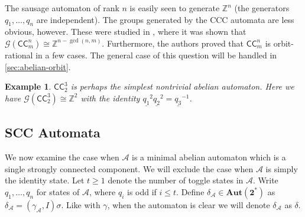 \documentclass[12pt, letterpaper]{article}
\newcommand{\Z}{\mathbb Z}
\newcommand{\bin}{\mathbf 2}
\newcommand{\A}{\mathcal A}
\newcommand{\CC}{\mathsf{CC}}
\newcommand{\Aut}{\mathbf{Aut}}
\newcommand{\gp}{\mathcal G}
\newtheorem{example}[thm]{Example}
\begin{document}
The sausage automaton of rank $n$ is easily seen to generate $\Z^n$ (the
generators $q_1, \ldots, q_n$ are independent).  The groups generated by
the CCC automata are less obvious, however. These were studied in
\cite{jalc170214}, where it was shown that $\gp(\CC^n_m) \cong \Z^{n - \gcd(n,
    m)}$. Furthermore, the authors proved that $\CC^n_m$ is orbit-rational in a
few cases. The general case of this question will be handled in
\cref{sec:abelian-orbit}.

\begin{example}
    $\CC^3_2$ is perhaps the simplest nontrivial abelian automaton. Here we
    have $\gp(\CC^3_2) \cong \Z^2$ with the identity
    $\underline{q_1}^2 \underline{q_2}^2 = \underline{q_3}^{-1}$.
\end{example}

\subsection{SCC Automata}
We now examine the case when $\A$ is a minimal abelian automaton which
is a single strongly connected component. We will exclude the case when
$\A$ is simply the identity state. Let $t \ge 1$ denote the number of toggle
states in $\A$. Write $q_1, \ldots, q_n$ for states of $\A$, where $q_i$ is odd
if $i \le t$. Define $\delta_\A \in \Aut(\bin^*)$ as $\delta_\A = (\gamma_\A,
I)\sigma$.  Like with $\gamma$, when the automaton is clear we will denote
$\delta_\A$ as $\delta$.
\end{document}
